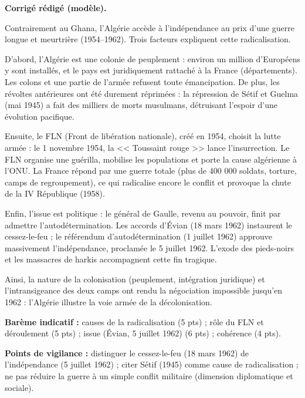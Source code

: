 \documentclass[11pt]{article}
\newcommand{\cle}[1]{{\popxbold\color{popdark}#1}}
\begin{document}
\begin{corrige}
\textbf{Corrigé rédigé (modèle).}

Contrairement au Ghana, l'Algérie accède à l'indépendance au prix d'une guerre longue et meurtrière (1954--1962). Trois facteurs expliquent cette radicalisation.

D'abord, l'Algérie est une colonie de peuplement : environ un million d'Européens y sont installés, et le pays est juridiquement rattaché à la France (départements). Les colons et une partie de l'armée refusent toute émancipation. De plus, les révoltes antérieures ont été durement réprimées : la répression de Sétif et Guelma (mai 1945) a fait des milliers de morts musulmans, détruisant l'espoir d'une évolution pacifique.

Ensuite, le \cle{FLN} (Front de libération nationale), créé en 1954, choisit la lutte armée : le 1\ier{} novembre 1954, la << Toussaint rouge >> lance l'insurrection. Le FLN organise une guérilla, mobilise les populations et porte la cause algérienne à l'ONU. La France répond par une guerre totale (plus de 400 000 soldats, torture, camps de regroupement), ce qui radicalise encore le conflit et provoque la chute de la IV\ieme{} République (1958).

Enfin, l'issue est politique : le général de Gaulle, revenu au pouvoir, finit par admettre l'autodétermination. Les \cle{accords d'Évian} (18 mars 1962) instaurent le cessez-le-feu ; le référendum d'autodétermination (1\ier{} juillet 1962) approuve massivement l'indépendance, proclamée le \cle{5 juillet 1962}. L'exode des pieds-noirs et les massacres de harkis accompagnent cette fin tragique.

Ainsi, la nature de la colonisation (peuplement, intégration juridique) et l'intransigeance des deux camps ont rendu la négociation impossible jusqu'en 1962 : l'Algérie illustre la voie armée de la décolonisation.

\textbf{Barème indicatif :} causes de la radicalisation (5 pts) ; rôle du FLN et déroulement (5 pts) ; issue (Évian, 5 juillet 1962) (6 pts) ; cohérence (4 pts).

\textbf{Points de vigilance :} distinguer le cessez-le-feu (18 mars 1962) de l'indépendance (5 juillet 1962) ; citer Sétif (1945) comme cause de radicalisation ; ne pas réduire la guerre à un simple conflit militaire (dimension diplomatique et sociale).
\end{corrige}
\end{document}
